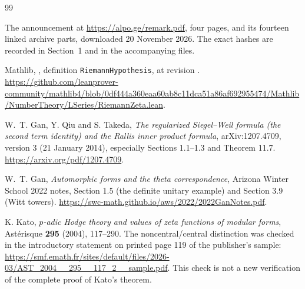 \documentclass[11pt,a4paper]{article}
\theoremstyle{remark}
\newcommand{\code}[1]{\texttt{#1}}
\begin{document}
\begin{thebibliography}{99}
\small
\raggedright
{}
The announcement at \url{https://alpo.ge/remark.pdf}, four pages,
and its fourteen linked archive parts, downloaded 20 November 2026.
The exact hashes are recorded in Section~1 and in the accompanying files.

Mathlib, ,
definition \code{RiemannHypothesis}, at revision
.
\url{https://github.com/leanprover-community/mathlib4/blob/0df444a360eaa60ab8c11dca51a86af692955474/Mathlib/NumberTheory/LSeries/RiemannZeta.lean}.

W.~T. Gan, Y. Qiu and S. Takeda,
\emph{The regularized Siegel--Weil formula (the second term identity)
and the Rallis inner product formula},
arXiv:1207.4709, version 3 (21 January 2014),
especially Sections 1.1--1.3 and Theorem 11.7.
\url{https://arxiv.org/pdf/1207.4709}.

W.~T. Gan, \emph{Automorphic forms and the theta correspondence},
Arizona Winter School 2022 notes,
Section 1.5 (the definite unitary example) and Section 3.9 (Witt towers).
\url{https://swc-math.github.io/aws/2022/2022GanNotes.pdf}.

K. Kato, \emph{$p$-adic Hodge theory and values of zeta functions of
modular forms}, Ast\'erisque \textbf{295} (2004), 117--290.
The noncentral/central distinction was checked in the introductory
statement on printed page 119 of the publisher's sample:
\url{https://smf.emath.fr/sites/default/files/2026-03/AST_2004__295__117_2__sample.pdf}.
This check is not a new verification of the complete proof of Kato's theorem.


\end{thebibliography}
\end{document}
